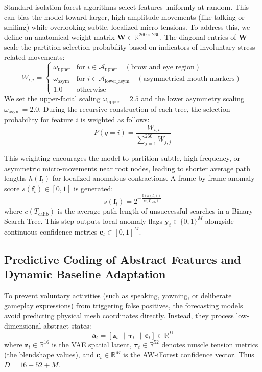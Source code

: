 \documentclass[sigconf]{acmart}
\begin{document}
Standard isolation forest algorithms select features uniformly at random. This can bias the model toward larger, high-amplitude movements (like talking or smiling) while overlooking subtle, localized micro-tensions. To address this, we define an anatomical weight matrix $\mathbf{W} \in \mathbb{R}^{260 \times 260}$. The diagonal entries of $\mathbf{W}$ scale the partition selection probability based on indicators of involuntary stress-related movements:
$$W_{i,i} = \begin{cases} 
\omega_{\text{upper}} & \text{for } i \in \mathcal{A}_{\text{upper}} \quad (\text{brow and eye region}) \\
\omega_{\text{asym}} & \text{for } i \in \mathcal{A}_{\text{lower\_asym}} \quad (\text{asymmetrical mouth markers}) \\
1.0 & \text{otherwise}
\end{cases}$$
We set the upper-facial scaling $\omega_{\text{upper}} = 2.5$ and the lower asymmetry scaling $\omega_{\text{asym}} = 2.0$. During the recursive construction of each tree, the selection probability for feature $i$ is weighted as follows:
$$P(q = i) = \frac{W_{i,i}}{\sum_{j=1}^{260} W_{j,j}}$$

This weighting encourages the model to partition subtle, high-frequency, or asymmetric micro-movements near root nodes, leading to shorter average path lengths $h(\mathbf{f}_t)$ for localized anomalous contractions. A frame-by-frame anomaly score $s(\mathbf{f}_t) \in [0, 1]$ is generated:
$$s(\mathbf{f}_t) = 2^{-\frac{\mathbb{E}(h(\mathbf{f}_t))}{c(T_{\text{calib}})}}$$
where $c(T_{\text{calib}})$ is the average path length of unsuccessful searches in a Binary Search Tree. This step outputs local anomaly flags $\mathbf{y}_t \in \{0, 1\}^M$ alongside continuous confidence metrics $\mathbf{c}_t \in [0, 1]^M$.

\subsection{Predictive Coding of Abstract Features and Dynamic Baseline Adaptation}
To prevent voluntary activities (such as speaking, yawning, or deliberate gameplay expressions) from triggering false positives, the forecasting models avoid predicting physical mesh coordinates directly. Instead, they process low-dimensional abstract states:
$$\mathbf{a}_t = [\mathbf{z}_t \,\|\, \boldsymbol{\tau}_t \,\|\, \mathbf{c}_t] \in \mathbb{R}^{D}$$
where $\mathbf{z}_t \in \mathbb{R}^{16}$ is the VAE spatial latent, $\boldsymbol{\tau}_t \in \mathbb{R}^{52}$ denotes muscle tension metrics (the blendshape values), and $\mathbf{c}_t \in \mathbb{R}^{M}$ is the AW-iForest confidence vector. Thus $D = 16 + 52 + M$.
\end{document}
